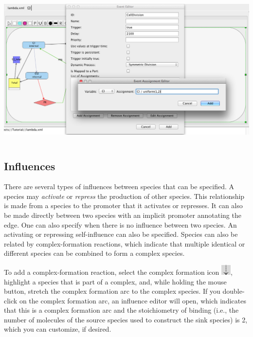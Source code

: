 \documentclass[titlepage,11pt]{article}
\begin{document}
\begin{center}
\includegraphics[height=80mm]{screenshots/event}
\end{center}

\subsection{\label{Influences}Influences}

There are several types of influences between species that can be specified.  A species may \emph{activate} or \emph{repress} the production of other species.  This relationship is made from a species to the promoter that it activates or represses.  It can also be made directly between two species with an implicit promoter annotating the edge.  One can also specify when there is no influence between two species.  An activating or repressing self-influence can also be specified.  Species can also be related by complex-formation reactions, which indicate that multiple identical or different species can be combined to form a complex species.  

To add a complex-formation reaction, select the complex formation icon \includegraphics{../gui/icons/modelview/bio_activation_selected}, highlight a species that is part of a complex, and, while holding the mouse button, stretch the complex formation arc to the complex species.  If you double-click on the complex formation arc, an influence editor will open, which indicates that this is a complex formation arc and the stoichiometry of binding (i.e., the number of molecules of the source species used to construct the sink species) is 2, which you can customize, if desired.
\end{document}
